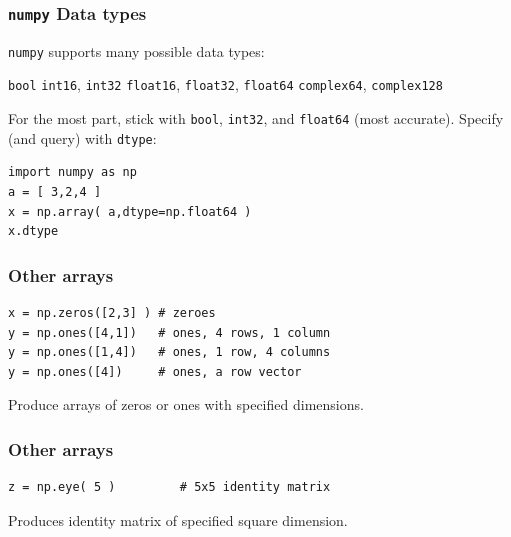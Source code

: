\documentclass[11pt]{beamer}
\begin{document}
\begin{frame}[fragile]
  \frametitle{\texttt{numpy} Data types}
  \Enlarge

  \begin{enumerate}
  \myitem  \texttt{numpy} supports many possible data types:
    \begin{enumerate}
    \mysubitem  \texttt{bool}
    \mysubitem  \texttt{int16}, \texttt{int32}
    \mysubitem  \texttt{float16}, \texttt{float32}, \texttt{float64}
    \mysubitem  \texttt{complex64}, \texttt{complex128}
    \end{enumerate} %
  \myitem  For the most part, stick with \texttt{bool}, \texttt{int32}, and \texttt{float64} (most accurate).
  \myitem  Specify (and query) with \texttt{dtype}:
  \end{enumerate}
  \begin{Verbatim}
import numpy as np
a = [ 3,2,4 ]
x = np.array( a,dtype=np.float64 )
x.dtype
  \end{Verbatim}
\end{frame}



\begin{frame}[fragile]
  \frametitle{Other arrays}
  \Enlarge
  \begin{Verbatim}
x = np.zeros([2,3] ) # zeroes
y = np.ones([4,1])   # ones, 4 rows, 1 column
y = np.ones([1,4])   # ones, 1 row, 4 columns
y = np.ones([4])     # ones, a row vector
  \end{Verbatim}

  \begin{enumerate}
  \myitem  Produce arrays of zeros or ones with specified dimensions.
  \end{enumerate}
\end{frame}

\begin{frame}[fragile]
  \frametitle{Other arrays}
  \Enlarge

  \begin{Verbatim}
z = np.eye( 5 )         # 5x5 identity matrix
  \end{Verbatim}
  \begin{enumerate}
  \myitem  Produces identity matrix of specified square dimension.
  \end{enumerate}
\end{frame}
\end{document}
